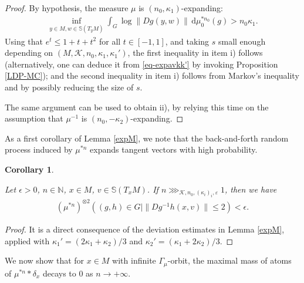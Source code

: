 \documentclass[11pt, leqno, fleqn]{amsart}
\def\eps{\varepsilon}
\def \N{{\mathbb N}}
\newcommand{\dd}{\,\mathrm{d}}
\newcommand{\cK}{{\mathcal K}}
\newcommand{\ary}{\begin{eqnarray}}
\newcommand{\eary}{\end{eqnarray}}
\newcommand{\aryst}{\begin{eqnarray*}}
\newcommand{\earyst}{\end{eqnarray*}}
\newtheorem{cor}[thm]{\bf Corollary}
\theoremstyle{definition}
\theoremstyle{definition}
\def\S{ {\mathbb{S}} }
\begin{document}
\begin{proof}

 
By hypothesis, the measure $\mu$ is $(n_{0},\kappa_{1})$-expanding: 
\ary\label{eq-expavkk'}
\inf_{y \in M, w \in \S(T_y M)} \int_{G}   \log   \|   Dg(y, w) \|  \dd\mu_{0}^{* n_0}(g) > n_{0}\kappa_{1}.
\eary
Using that $e^t\leq 1+t+t^2$ for all $t\in [-1,1]$, and taking $s$ small enough depending on $(M, \cK, n_{0},\kappa_{1}, \kappa_{1}')$, the first inequality in item i) follows (alternatively, one can deduce it from \eqref{eq-expavkk'} by invoking Proposition \ref{LDP-MC}); and the second inequality in item i) follows from Markov's inequality and by possibly reducing the size of $s$.
 

The same argument can be used to obtain ii), by relying this time on the assumption that $\mu^{-1}$ is $(n_{0},-\kappa_{2})$-expanding.
\end{proof}



As a first corollary of Lemma \ref{expM}, we note that the back-and-forth random process induced by $\mu^{*n}$  expands tangent vectors with high probability. 
 
\begin{cor} \label{lem NonConcentrationofAngles} 

	Let $\epsilon > 0$,  $n\in \N$, $x \in M$, $v  \in \S(T_xM)$. If $n \ggg_{\cK,n_{0}, (\kappa_{i})_{i},\eps} 1$, then we have 
	\aryst
	(\mu^{* n})^{\otimes 2}( (g,h) \in G \mid  \| Dg^{-1}h(x, v) \| \leq 2   ) < \epsilon.
	\earyst
\end{cor}

\begin{proof}
It is a direct consequence of the deviation estimates in Lemma \ref{expM}, applied with $\kappa_{1}'= (2\kappa_{1}+\kappa_{2})/3$ and $\kappa_{2}'=(\kappa_{1}+2\kappa_{2})/3$.
\end{proof}


We now show that for $x\in M$ with infinite $\Gamma_{\mu}$-orbit, the maximal mass of atoms of $\mu^{*n}*\delta_{x}$ decays to $0$ as $n\to +\infty$. 
\end{document}
